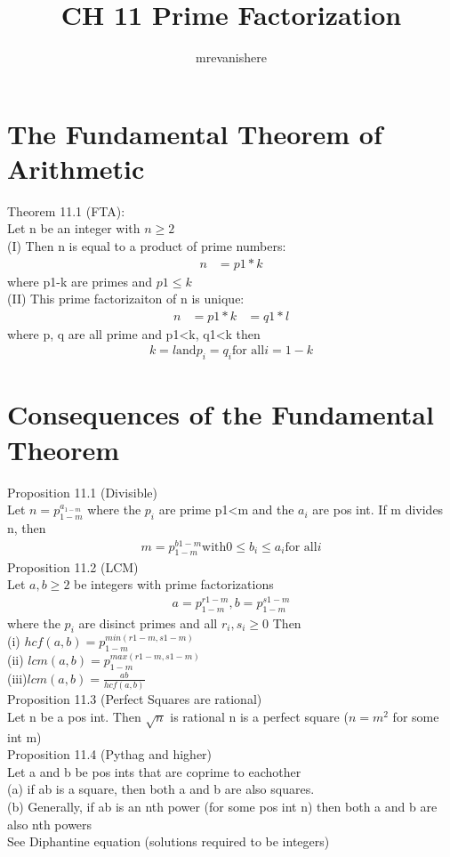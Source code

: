 \documentclass[12pt]{article}
\begin{document}
\title{CH 11 Prime Factorization}
\author{mrevanishere}
\maketitle

\section{The Fundamental Theorem of Arithmetic}
	Theorem 11.1 (FTA): \\
	Let n be an integer with $ n \ge 2 $\\
	(I) Then n is equal to a product of prime numbers:
	\begin{align*}
		n &= p1*k
	\end{align*}
	where p1-k are primes and $ p1 \le k $ \\
	(II) This prime factorizaiton of n is unique: 
	\begin{align*}
		n &=  p1*k &= q1*l
	\end{align*}
	where p, q are all prime and p1<k, q1<k then
	\begin{align*}
		k = l \text{and} p_i = q_i \text{for all} i = 1-k
	\end{align*}
\section{Consequences of the Fundamental Theorem}
	Proposition 11.1 (Divisible)\\
	Let $ n = p_{1-m}^{a_{1-m}} $ where the $ p_i $ are prime
	p1<m and the $ a_i $ are pos int. If m divides n, then
	\begin{align*}
		m = p_{1-m}^{b1-m} \text{with} 0 \le b_i \le a_i \text{for all} i
	\end{align*}
	Proposition 11.2 (LCM) \\
	Let $ a, b \ge 2 $ be integers with prime factorizations
	\begin{align*}
		a = p_{1-m}^{r1-m}, b = p_{1-m}^{s1-m}
	\end{align*}
	where the $ p_i $ are disinct primes and all $ r_i, s_i \ge 0 $ Then\\
	(i) $ hcf(a, b) = p_{1-m}^{min(r1-m, s1-m)} $ \\
	(ii) $ lcm(a, b) = p_{1-m}^{max(r1-m, s1-m)} $ \\
	(iii)$ lcm(a, b) = \frac{ab}{hcf(a, b)} $ \\
	Proposition 11.3 (Perfect Squares are rational) \\
	Let n be a pos int. Then $ \sqrt{n}  $ is rational \iff  n is a 
	perfect square ($ n = m^2 $ for some int m) \\
	Proposition 11.4 (Pythag and higher)\\
	Let a and b be pos ints that are coprime to eachother \\
	(a) if ab is a square, then both a and b are also squares. \\
	(b) Generally, if ab is an nth power (for some pos int n) then
	both a and b are also nth powers \\
	See Diphantine equation (solutions required to be integers)
\end{document}
